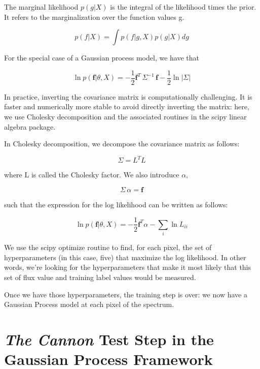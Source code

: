 \documentclass[12pt, preprint]{aastex}
\begin{document}
The marginal likelihood $p(g|X)$ is the integral of the likelihood times the
prior. It refers to the marginalization over the function values g.  

\begin{equation}
  p(f|X) = \int p(f|g,X) p(g|X)dg
  \label{}
\end{equation}

For the special case of a Gaussian process model, we have that 

\begin{equation}
  \ln{p}(\textbf{f} | \theta, X) = 
  -\frac{1}{2} \textbf{f}^{T}\,\Sigma^{-1}\,\textbf{f}-\frac{1}{2}\ln{|\Sigma|}
\end{equation}

In practice, inverting the covariance matrix is computationally challenging.
It is faster and numerically more stable to avoid directly inverting the 
matrix: here, we use Cholesky decomposition and the associated routines
in the scipy linear algebra package. 

In Cholesky decomposition, we decompose the covariance matrix as follows:

\begin{equation}
  \Sigma = L^T L  
  \label{}
\end{equation}

where L is called the Cholesky factor. We also introduce $\alpha$, 

\begin{equation}
  \Sigma \, \alpha = \textbf{f}
  \label{}
\end{equation}

such that the expression for the log likelihood can be written as follows:

\begin{equation}
  \ln{p}(\textbf{f} | \theta, X) = 
  -\frac{1}{2} \textbf{f}^T \alpha - \sum_i \ln{L_{ii}}
\end{equation}

We use the scipy optimize routine to find, for each pixel, the set of
hyperparameters (in this case, five) that maximize the log likelihood. 
In other words, we're looking for the hyperparameters that make it most likely
that this set of flux value and training label values would be measured.

Once we have those hyperparameters, the training step is over: we now have
a Gaussian Process model at each pixel of the spectrum. 


\section{\emph{The Cannon} Test Step in the Gaussian Process Framework}
\end{document}
